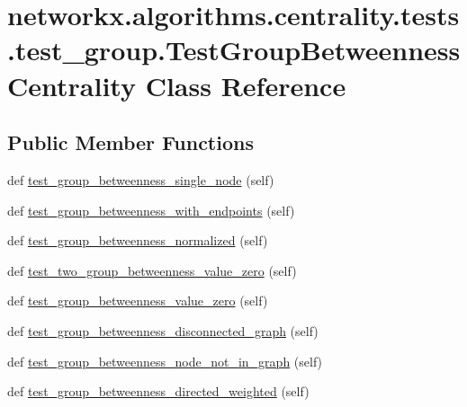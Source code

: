 \hypertarget{classnetworkx_1_1algorithms_1_1centrality_1_1tests_1_1test__group_1_1TestGroupBetweennessCentrality}{}\section{networkx.\+algorithms.\+centrality.\+tests.\+test\+\_\+group.\+Test\+Group\+Betweenness\+Centrality Class Reference}
\label{classnetworkx_1_1algorithms_1_1centrality_1_1tests_1_1test__group_1_1TestGroupBetweennessCentrality}
\subsection*{Public Member Functions}
\begin{DoxyCompactItemize}
\item 
def \hyperlink{classnetworkx_1_1algorithms_1_1centrality_1_1tests_1_1test__group_1_1TestGroupBetweennessCentrality_a54e08805d8b5dc0c560c8ed421833ac8}{test\+\_\+group\+\_\+betweenness\+\_\+single\+\_\+node} (self)
\item 
def \hyperlink{classnetworkx_1_1algorithms_1_1centrality_1_1tests_1_1test__group_1_1TestGroupBetweennessCentrality_a58e7d7637b59505af2345a9682ba8e91}{test\+\_\+group\+\_\+betweenness\+\_\+with\+\_\+endpoints} (self)
\item 
def \hyperlink{classnetworkx_1_1algorithms_1_1centrality_1_1tests_1_1test__group_1_1TestGroupBetweennessCentrality_abc551894af345c3d623d90d4c15ff60a}{test\+\_\+group\+\_\+betweenness\+\_\+normalized} (self)
\item 
def \hyperlink{classnetworkx_1_1algorithms_1_1centrality_1_1tests_1_1test__group_1_1TestGroupBetweennessCentrality_a61a89fd149782ce6ec58c642aaa2e4a8}{test\+\_\+two\+\_\+group\+\_\+betweenness\+\_\+value\+\_\+zero} (self)
\item 
def \hyperlink{classnetworkx_1_1algorithms_1_1centrality_1_1tests_1_1test__group_1_1TestGroupBetweennessCentrality_a33cec51046e56f34678381b261646d7b}{test\+\_\+group\+\_\+betweenness\+\_\+value\+\_\+zero} (self)
\item 
def \hyperlink{classnetworkx_1_1algorithms_1_1centrality_1_1tests_1_1test__group_1_1TestGroupBetweennessCentrality_adfe5fc0f38c8bacb00c4f7ff2658b26e}{test\+\_\+group\+\_\+betweenness\+\_\+disconnected\+\_\+graph} (self)
\item 
def \hyperlink{classnetworkx_1_1algorithms_1_1centrality_1_1tests_1_1test__group_1_1TestGroupBetweennessCentrality_a8a037e7abad51ea581c3c53ac8b65993}{test\+\_\+group\+\_\+betweenness\+\_\+node\+\_\+not\+\_\+in\+\_\+graph} (self)
\item 
def \hyperlink{classnetworkx_1_1algorithms_1_1centrality_1_1tests_1_1test__group_1_1TestGroupBetweennessCentrality_aad11eab19bf2b3c45c1597840355b7d0}{test\+\_\+group\+\_\+betweenness\+\_\+directed\+\_\+weighted} (self)
\end{DoxyCompactItemize}


